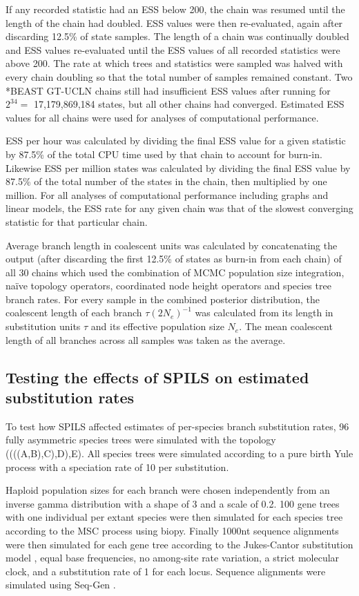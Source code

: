 \documentclass[nogrid]{MBE}%
\begin{document}
If any recorded statistic had an ESS below 200, the chain was resumed until
the length of the chain had doubled. ESS values were then re-evaluated, again
after discarding 12.5\% of state samples. The length of a chain was
continually doubled and ESS values re-evaluated until the ESS values of all
recorded statistics were above 200. The rate at which trees and statistics
were sampled was halved with every chain doubling so that the total number of
samples remained constant. Two *BEAST GT-UCLN chains still had insufficient
ESS values after running for $2^{34} =$ 17,179,869,184 states, but all other
chains had converged. Estimated ESS values for all chains were used for
analyses of computational performance.

ESS per hour was calculated by dividing the final ESS value for a given
statistic by 87.5\% of the total CPU time used by that chain to account for
burn-in. Likewise ESS per million states was calculated by dividing the final
ESS value by 87.5\% of the total number of the states in the chain, then
multiplied by one million. For all analyses of computational performance
including graphs and linear models, the ESS rate for any given chain was that
of the slowest converging statistic for that particular chain.

Average branch length in coalescent units was calculated by concatenating the
output (after discarding the first 12.5\% of states as burn-in from each
chain) of all 30 chains which used the combination of MCMC population size
integration, na\"ive topology operators, coordinated node height operators and
species tree branch rates. For every sample in the combined posterior
distribution, the coalescent length of each branch $\tau(2N_e)^{-1}$ was
calculated from its length in substitution units $\tau$ and its effective
population size $N_e$. The mean coalescent length of all branches across all
samples was taken as the average.

\subsection{Testing the effects of SPILS on estimated substitution rates}

To test how SPILS affected estimates of per-species branch substitution rates,
96 fully asymmetric species trees were simulated with the topology
((((A,B),C),D),E). All species trees were simulated according to a pure birth Yule
process \citep{Yule21} with a speciation rate of 10 per substitution.

Haploid population sizes for each branch were chosen independently from an
inverse gamma distribution with a shape of 3 and a scale of 0.2. 100 gene trees
with one individual per extant species were then simulated for each species tree
according to the MSC process using biopy. Finally 1000nt sequence alignments
were then simulated for each gene tree according to the Jukes-Cantor
substitution model \citep{JUKES196921}, equal base frequencies, no among-site
rate variation, a strict molecular clock, and a substitution rate of 1 for each
locus. Sequence alignments were simulated using Seq-Gen \citep{Rambaut01061997}.
\end{document}
